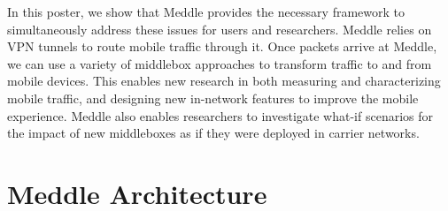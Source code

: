 \documentclass{sig-alternate-10pt}
\newcommand{\eat}[1]{}
\newcommand{\meddle}{{Meddle}\xspace}
\begin{document}
In this poster, we show that \meddle provides the necessary
framework to simultaneously address these issues for users and
researchers. \meddle relies on VPN tunnels to route mobile traffic
through it. Once packets arrive at \meddle, we can use a variety of
middlebox approaches to transform traffic to and from mobile
devices. This enables new research in both measuring and
characterizing mobile traffic, and designing new in-network features
to improve the mobile experience. \meddle also enables researchers
to investigate what-if scenarios for the impact of new middleboxes as
if they were deployed in carrier networks.   

\eat{
  -- services for cell phones
        -- what's diff't about cell phones?
            -- power
                -- prefetching/batching data
                -- offloading processing (virus scanning, comp vision, data analysis)
            -- exfiltration/desire to monitor (even from user)
            -- device limitations (transcoding)
           
        -- what's slightly different but needs tweaked?
            -- IDS -- different attacks/viruses
            -- Proto accel -- some protocols difft?

        -- what's exactly the same
            -- performance
            -- privacy (Do not Track, obfuscation)
            -- Protocol rollout (DNSSEC; SPDY, MPTCP)

    -- users locked out of their own devices
    -- platform for measurement
        }
\eat{
    \section{Service Deployment}

    \section{Measurement Platform}

    \section{Challenges}

    \section{Conclusion \& Related Work}\
}
   
\section{\meddle Architecture}
\end{document}
